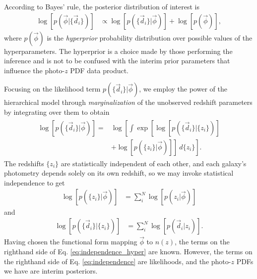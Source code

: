 \documentclass[iop]{emulateapj}
\begin{document}
According to Bayes' rule, the posterior distribution of interest is
\begin{align}
\label{eq:hyper_bayes}
\log[p(\vec{\phi} | \{\vec{d}_{i}\})] &\propto \log[p(\{\vec{d}_{i}\} | 
\vec{\phi})] + \log[p(\vec{\phi})] ,
\end{align}
where $p(\vec{\phi})$ is the \textit{hyperprior} probability distribution over 
possible values of the hyperparameters.  The hyperprior is a choice made by 
those performing the inference and is not to be confused with the interim prior 
parameters that influence the photo-$z$ PDF data product.

Focusing on the likelihood term $p(\{\vec{d}_{i}\} | \vec{\phi})$, we employ 
the power of the hierarchical model through \textit{marginalization} of the 
unobserved redshift parameters by integrating over them to obtain 
\begin{align}
\label{eq:marginalize}
\begin{split}
\log[p(\{\vec{d}_{i}\} | \vec{\phi})] = & 
\log\left[\int\exp\left[\log[p(\{\vec{d}_{i}\} | \{z_{i}\})]\right.\right. \\
& \left.\left.+ \log[p(\{z_{i}\} | \vec{\phi})]\right]\ d\{z_{i}\}\right] .
\end{split}
\end{align}
The redshifts $\{z_{i}\}$ are statistically independent of each other, and each 
galaxy's photometry depends solely on its own redshift, so we may invoke 
statistical independence to get
\begin{align}
\label{eq:independence_hyper}
\log[p(\{z_{i}\} | \vec{\phi})] &= \sum_{i}^{N} \log[p(z_{i} | \vec{\phi})]
\end{align}
and
\begin{align}
\label{eq:independence}
\log[p(\{\vec{d}_{i}\} | \{z_{i}\})] &= \sum_{i}^{N} \log[p(\vec{d}_{i} | 
z_{i})] .
\end{align}
Having chosen the functional form mapping $\vec{\phi}$ to $n(z)$, the terms on 
the righthand side of Eq. \ref{eq:independence_hyper} are known.  However, the 
terms on the righthand side of Eq. \ref{eq:independence} are likelihoods, and 
the photo-$z$ PDFs we have are interim posteriors.
\end{document}
